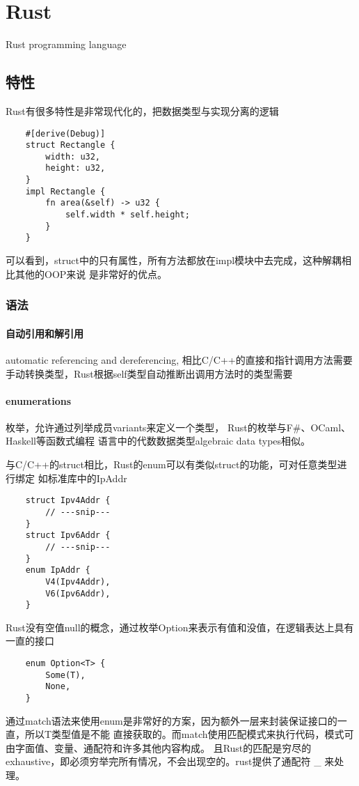 \chapter{Rust}

Rust programming language

\section{特性}

Rust有很多特性是非常现代化的，把数据类型与实现分离的逻辑
\begin{lstlisting}
    #[derive(Debug)]
    struct Rectangle {
        width: u32,
        height: u32,
    }
    impl Rectangle {
        fn area(&self) -> u32 {
            self.width * self.height;
        }
    }
\end{lstlisting}
可以看到，struct中的只有属性，所有方法都放在impl模块中去完成，这种解耦相比其他的OOP来说
是非常好的优点。

\subsection{语法}

\subsubsection{自动引用和解引用}
automatic referencing and dereferencing, 
相比C/C++的直接和指针调用方法需要手动转换类型，Rust根据self类型自动推断出调用方法时的类型需要

\subsubsection{enumerations}

枚举，允许通过列举成员variants来定义一个类型， Rust的枚举与F\#、OCaml、Haskell等函数式编程
语言中的代数数据类型algebraic data types相似。

与C/C++的struct相比，Rust的enum可以有类似struct的功能，可对任意类型进行绑定
如标准库中的IpAddr
\begin{lstlisting}
    struct Ipv4Addr {
        // ---snip---
    }
    struct Ipv6Addr {
        // ---snip---
    }
    enum IpAddr {
        V4(Ipv4Addr),
        V6(Ipv6Addr),
    }
\end{lstlisting}

Rust没有空值null的概念，通过枚举Option来表示有值和没值，在逻辑表达上具有一直的接口
\begin{lstlisting}
    enum Option<T> {
        Some(T),
        None,
    }
\end{lstlisting}
通过match语法来使用enum是非常好的方案，因为额外一层来封装保证接口的一直，所以T类型值是不能
直接获取的。而match使用匹配模式来执行代码，模式可由字面值、变量、通配符和许多其他内容构成。
且Rust的匹配是穷尽的exhaustive，即必须穷举完所有情况，不会出现空的。rust提供了通配符 \_ 来处理。


